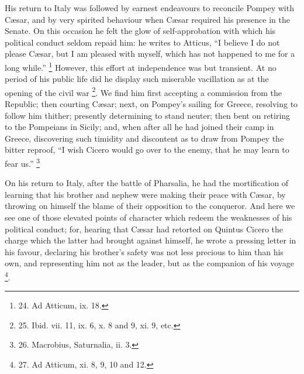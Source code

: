 His return to Italy was
followed by earnest endeavours to reconcile Pompey with Cæsar, and by
very spirited behaviour when Cæsar required his presence in the
Senate. On this occasion he felt the glow of self-approbation with
which his political conduct seldom repaid him: he writes to
Atticus, ``I believe I do not please Cæsar, but I am pleased with
myself, which has not happened to me for a long while.'' \footnote{24. Ad Atticum, ix. 18.} However, this effort at independence was but transient. At no
period of his public life did he display such miserable vacillation as
at the opening of the civil war \footnote{25. Ibid. vii. 11, ix. 6, x. 8
and 9, xi. 9, etc.}. We find him first accepting a commission from the Republic;
then courting Cæsar; next, on Pompey's sailing for Greece, resolving
to follow him thither; presently determining to stand neuter; then
bent on retiring to the Pompeians in Sicily; and, when after all he
had joined their camp in Greece, discovering such timidity and
discontent as to draw from Pompey the bitter reproof, ``I wish Cicero
would go over to the enemy, that he may learn to fear us.'' \footnote{26. Macrobius, Saturnalia, ii.
3.}

On his return to Italy, after
the battle of Pharsalia, he had the mortification of learning that his
brother and nephew were making their peace with Cæsar, by throwing on
himself the blame of their opposition to the conqueror. And here we
see one of those elevated points of character which redeem the
weaknesses of his political conduct; for, hearing that Cæsar had
retorted on Quintus Cicero the charge which the latter had brought
against himself, he wrote a pressing letter in his favour, declaring
his brother's safety was not less precious to him than his own, and
representing him not as the leader, but as the companion of his voyage
\footnote{27. Ad Atticum, xi. 8, 9, 10
and 12.}.

